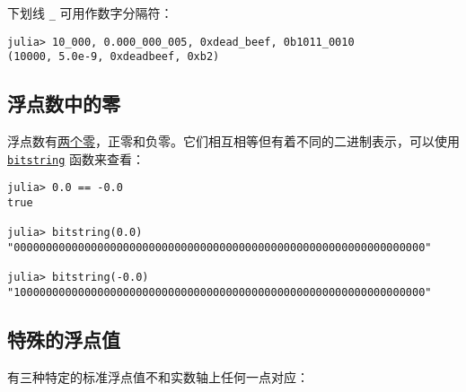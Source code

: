 下划线 \texttt{\_} 可用作数字分隔符：




\begin{verbatim}
julia> 10_000, 0.000_000_005, 0xdead_beef, 0b1011_0010
(10000, 5.0e-9, 0xdeadbeef, 0xb2)
\end{verbatim}



\hypertarget{3917895508430327726}{}


\subsection{浮点数中的零}



浮点数有\href{https://zh.wikipedia.org/wiki/\%E2\%88\%920}{两个零}，正零和负零。它们相互相等但有着不同的二进制表示，可以使用 \hyperlink{9171163989026657457}{\texttt{bitstring}} 函数来查看：




\begin{verbatim}
julia> 0.0 == -0.0
true

julia> bitstring(0.0)
"0000000000000000000000000000000000000000000000000000000000000000"

julia> bitstring(-0.0)
"1000000000000000000000000000000000000000000000000000000000000000"
\end{verbatim}



\hypertarget{16626704755049875766}{}


\subsection{特殊的浮点值}



有三种特定的标准浮点值不和实数轴上任何一点对应：






